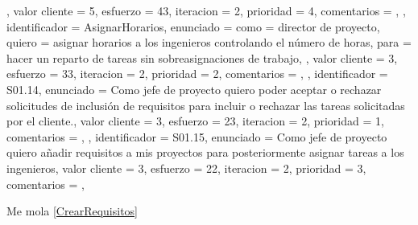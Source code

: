 \documentclass[a4paper, 12pt, spanish]{memoria}
\begin{document}
{{{    },
    valor cliente = 5,
    esfuerzo      = {4}{3},
    iteracion     = 2,
    prioridad     = 4,
    comentarios   = {},
},{%
    identificador = AsignarHorarios,
    enunciado     = {%
        como = {director de proyecto},
        quiero = {asignar horarios a los ingenieros controlando el número de horas},
        para = {hacer un reparto de tareas sin sobreasignaciones de trabajo},
    },
    valor cliente = 3,
    esfuerzo      = {3}{3},
    iteracion     = 2,
    prioridad     = 2,
    comentarios   = {},
},{%
    identificador = S01.14,
    enunciado     = {Como jefe de proyecto quiero poder aceptar o rechazar solicitudes  de inclusión de requisitos para incluir o rechazar las tareas solicitadas por el cliente.},
    valor cliente = 3,
    esfuerzo      = {2}{3},
    iteracion     = 2,
    prioridad     = 1,
    comentarios   = {},
},{%
    identificador = S01.15,
    enunciado     = {Como jefe de proyecto quiero añadir requisitos a mis proyectos para posteriormente asignar tareas a los ingenieros},
    valor cliente = 3,
    esfuerzo      = {2}{2},
    iteracion     = 2,
    prioridad     = 3,
    comentarios   = {},
}} %

Me mola \ref{CrearRequisitos}
\end{document}
